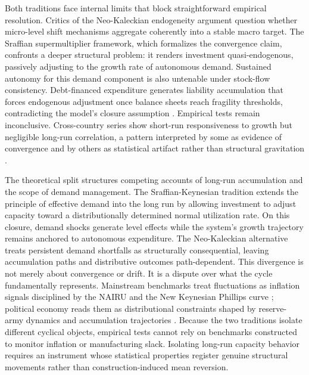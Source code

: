 \documentclass[11pt]{article}
\begin{document}
Both traditions face internal limits that block straightforward empirical resolution. Critics of the Neo-Kaleckian endogeneity argument question whether micro-level shift mechanisms aggregate coherently into a stable macro target. The Sraffian supermultiplier framework, which formalizes the convergence claim, confronts a deeper structural problem: it renders investment quasi-endogenous, passively adjusting to the growth rate of autonomous demand. Sustained autonomy for this demand component is also untenable under stock-flow consistency. Debt-financed expenditure generates liability accumulation that forces endogenous adjustment once balance sheets reach fragility thresholds, contradicting the model's closure assumption \citep{Nikiforos2018}. Empirical tests remain inconclusive. Cross-country series show short-run responsiveness to growth but negligible long-run correlation, a pattern interpreted by some as evidence of convergence and by others as statistical artifact rather than structural gravitation \citep{GahnGonzalez2022}.

The theoretical split structures competing accounts of long-run accumulation and the scope of demand management. The Sraffian-Keynesian tradition extends the principle of effective demand into the long run by allowing investment to adjust capacity toward a distributionally determined normal utilization rate. On this closure, demand shocks generate level effects while the system's growth trajectory remains anchored to autonomous expenditure. The Neo-Kaleckian alternative treats persistent demand shortfalls as structurally consequential, leaving accumulation paths and distributive outcomes path-dependent. This divergence is not merely about convergence or drift. It is a dispute over what the cycle fundamentally represents. Mainstream benchmarks treat fluctuations as inflation signals disciplined by the NAIRU and the New Keynesian Phillips curve \citep{Friedman1968, Phelps1968, Gali2015}; political economy reads them as distributional constraints shaped by reserve-army dynamics and accumulation trajectories \citep{Goodwin1967, MarxKVI}. Because the two traditions isolate different cyclical objects, empirical tests cannot rely on benchmarks constructed to monitor inflation or manufacturing slack. Isolating long-run capacity behavior requires an instrument whose statistical properties register genuine structural movements rather than construction-induced mean reversion.
\end{document}
